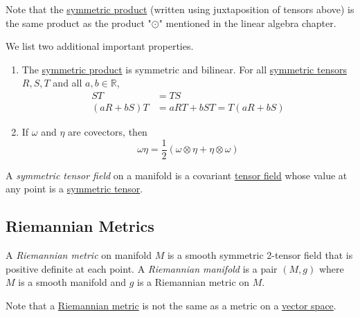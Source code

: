 \documentclass{article}
\newcounter{theorem}[section]
\newcounter{definition}[section]
\begin{document}
    Note that the \hyperref[def:symmetric-product]{symmetric product} (written using juxtaposition of tensors above) is the same product as the product "$\odot$" mentioned in the linear algebra chapter.  

    \begin{theorem}
      \label{thm:properties-of-the-symmetric-product}
    We list two additional important properties. 
    \begin{enumerate}
        \item The \hyperref[def:symmetric-product]{symmetric product} is symmetric and bilinear. For all \hyperref[def:symmetric-tensor]{symmetric tensors} $R, S, T$ and all $a, b \in \mathbb{R}$, 
        \begin{align*}
            ST & = TS \\
            (a R + b S) T & = a RT + b ST= T (a R + bS) 
        \end{align*}
        \item If $\omega$ and $\eta$ are covectors, then 
        \begin{equation}
          \omega \eta = \frac{1}{2} (\omega \otimes \eta + \eta \otimes \omega)
        \end{equation}
    \end{enumerate}
    \end{theorem}

    \begin{definition}
      \label{def:symmetric-tensor-field}
    A \textit{symmetric tensor field} on a manifold is a covariant \hyperref[def:tensor-field]{tensor field} whose value at any point is a \hyperref[def:symmetric-tensor]{symmetric tensor}. 
    \end{definition}

  \subsection{Riemannian Metrics}

    \begin{definition}
      \label{def:riemannian-metric}
    A \textit{Riemannian metric} on manifold $M$ is a smooth symmetric 2-tensor field that is positive definite at each point. A \textit{Riemannian manifold} is a pair $(M, g)$ where $M$ is a smooth manifold and $g$ is a Riemannian metric on $M$. 
    \end{definition}

    Note that a \hyperref[def:riemannian-metric]{Riemannian metric} is not the same as a metric on a \hyperref[lin-def:vector-space]{vector space}. 
\end{document}
